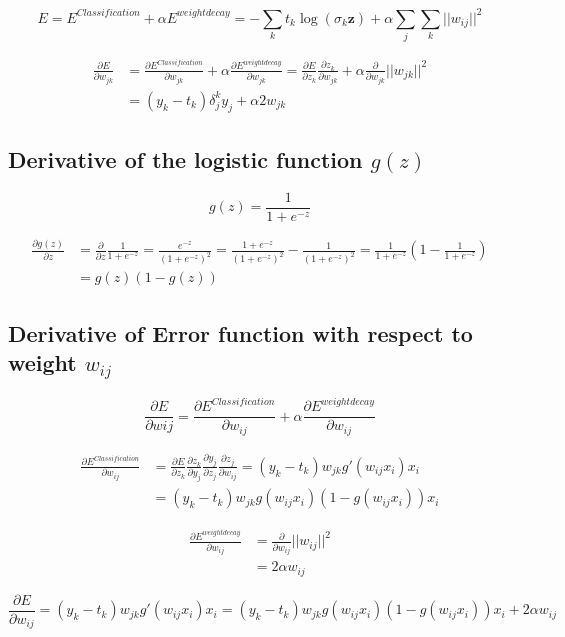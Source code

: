 \documentclass{article}
\begin{document}
\begin{equation}
E = E^{Classification}+\alpha E^{weightdecay} = -\sum_{k}t_k\log{(\sigma_k{\bm{z}})} + \alpha \sum_j\sum_k ||w_{ij}||^2
\end{equation}

\begin{align*}
	\frac{\partial E}{\partial w_{jk}} &= \frac{\partial E^{Classification}}{\partial w_{jk}}+\alpha \frac{\partial E^{weightdecay}}{\partial w_{jk}} = \frac{\partial E}{\partial z_k}\frac{\partial z_k}{\partial w_{jk}} + \alpha \frac{\partial}{\partial w_{jk}} ||w_{jk}||^2\\
	&= \left(y_k-t_k\right)\delta^{k}_{j}y_j + \alpha 2w_{jk}
\end{align*}




\subsection*{Derivative of the logistic function $g(z)$}

\begin{equation}
g(z) = \frac{1}{1+e^{-z}}
\end{equation}

\begin{align}
	\frac{\partial g(z)}{\partial z} &= \frac{\partial}{\partial z} \frac{1}{1+e^{-z}} = \frac{e^{-z}}{(1+e^{-z})^2} = \frac{1+e^{-z}}{(1+e^{-z})^2}-\frac{1}{(1+e^{-z})^2}= \frac{1}{1+e^{-z}}\left(1-\frac{1}{1+e^{-z}}\right)\\ &=g(z)(1-g(z))
\end{align}

\subsection*{Derivative of Error function with respect to weight $w_{ij}$}

\begin{equation}
\frac{\partial E}{\partial w{ij}} = \frac{\partial E^{Classification}}{\partial w_{ij}} + \alpha \frac{\partial E^{weightdecay}}{\partial w_{ij}}
\end{equation}

\begin{align*}
	\frac{\partial E^{Classification}}{\partial w_{ij}} &= \frac{\partial E}{\partial z_k}\frac{\partial z_k}{\partial y_j}\frac{\partial y_j}{\partial z_j}\frac{\partial z_j}{\partial w_{ij}} = (y_k-t_k)w_{jk} g'(w_{ij}x_i) x_i \\&= (y_k-t_k)w_{jk}g(w_{ij}x_i)(1-g(w_{ij}x_i))x_i
\end{align*}

\begin{align*}
	\frac{\partial E^{weightdecay}}{\partial w_{ij}} &= \frac{\partial}{\partial w_{ij}} ||w_{ij}||^2 \\&= 2\alpha w_{ij}
\end{align*}

\begin{equation}
\frac{\partial E}{\partial w_{ij}} = (y_k-t_k)w_{jk} g'(w_{ij}x_i) x_i = (y_k-t_k)w_{jk}g(w_{ij}x_i)(1-g(w_{ij}x_i))x_i+2\alpha w_{ij}
\end{equation}
\end{document}
